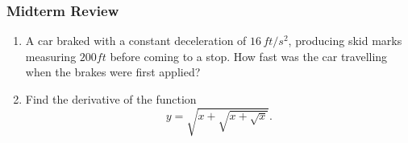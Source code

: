 \documentclass[t]{beamer}
\theoremstyle{plain}
\theoremstyle{definition}
\begin{document}
\begin{frame}
\frametitle{Midterm Review}
\begin{enumerate}[<+->]
\item[{\small \S3.7, \#46}] A car braked with a constant deceleration of $16\,ft/s^2$, producing skid marks measuring $200 ft$ before coming to a stop. How fast was the car travelling when the brakes were first applied?
\medskip
\item[{\small \S2.5, \#36}] Find the derivative of the function \[y=\sqrt{x+\sqrt{x+\sqrt{x}}}.\]
\end{enumerate}
\end{frame}
\end{document}
